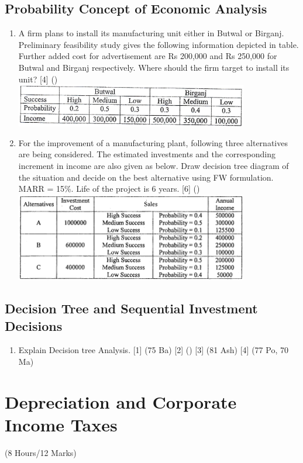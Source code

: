 \documentclass[12pt]{article}
\begin{document}
	\subsection{Probability Concept of Economic Analysis}
		\begin{enumerate}
			\item A firm plans to install its manufacturing unit either in Butwal or Birganj. Preliminary feasibility study gives the following information depicted in table. Further added cost for advertisement are Rs 200,000 and Rs 250,000 for Butwal and Birganj respectively. Where should the firm target to install its unit? \hfill [4] ()\\
			\includegraphics[width=4in]{./pics/ee_3}

			\item For the improvement of a manufacturing plant, following three alternatives are being considered. The estimated investments and the corresponding increment in income are also given as below. Draw decision tree diagram of the situation and decide on the best alternative using FW formulation. MARR = 15\%. Life of the project is 6 years. \hfill [6] ()
			\includegraphics[width=4in]{./pics/ee_4}
		\end{enumerate}

	\subsection{Decision Tree and Sequential Investment Decisions}
		\begin{enumerate}
			\item Explain Decision tree Analysis. \hfill [1] (75 Ba) [2] () [3] (81 Ash) [4] (77 Po, 70 Ma)
		\end{enumerate}

	\pagebreak

\section{Depreciation and Corporate Income Taxes}	
	\begin{center}(8 Hours/12 Marks)\end{center}
\end{document}
